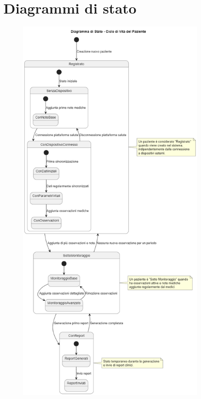 \documentclass[12pt,a4paper,oneside]{report}
\begin{document}
\section{Diagrammi di stato}
\begin{figure}[H]
    \centering
    \includegraphics[width=0.85\textwidth]{images/uml/PatientLifecycle.png}
\end{figure}
\end{document}
